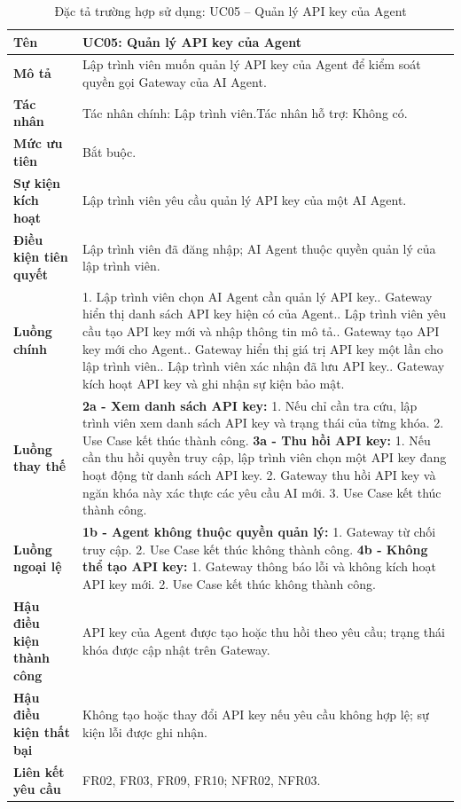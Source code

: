 \begin{longtable}{|L{4.2cm}|L{9.5cm}|}
\caption[Đặc tả UC05]{Đặc tả trường hợp sử dụng: UC05 -- Quản lý API key của Agent} \\\hline
\textbf{Tên} & UC05: Quản lý API key của Agent \\\hline
\textbf{Mô tả} & Lập trình viên muốn quản lý API key của Agent để kiểm soát quyền gọi Gateway của AI Agent.\\\hline
\textbf{Tác nhân} & Tác nhân chính: Lập trình viên.\newline Tác nhân hỗ trợ: Không có.\\\hline
\textbf{Mức ưu tiên} & Bắt buộc.\\\hline
\textbf{Sự kiện kích hoạt} & Lập trình viên yêu cầu quản lý API key của một AI Agent.\\\hline
\textbf{Điều kiện tiên quyết} & Lập trình viên đã đăng nhập; AI Agent thuộc quyền quản lý của lập trình viên.\\\hline
\textbf{Luồng chính} &
1. Lập trình viên chọn AI Agent cần quản lý API key.. Gateway hiển thị danh sách API key hiện có của Agent.. Lập trình viên yêu cầu tạo API key mới và nhập thông tin mô tả.. Gateway tạo API key mới cho Agent.. Gateway hiển thị giá trị API key một lần cho lập trình viên.. Lập trình viên xác nhận đã lưu API key.. Gateway kích hoạt API key và ghi nhận sự kiện bảo mật.\\\hline
\textbf{Luồng thay thế} &
\textbf{2a - Xem danh sách API key:} 1. Nếu chỉ cần tra cứu, lập trình viên xem danh sách API key và trạng thái của từng khóa. 2. Use Case kết thúc thành công.\newline
\textbf{3a - Thu hồi API key:} 1. Nếu cần thu hồi quyền truy cập, lập trình viên chọn một API key đang hoạt động từ danh sách API key. 2. Gateway thu hồi API key và ngăn khóa này xác thực các yêu cầu AI mới. 3. Use Case kết thúc thành công.\\\hline
\textbf{Luồng ngoại lệ} &
\textbf{1b - Agent không thuộc quyền quản lý:} 1. Gateway từ chối truy cập. 2. Use Case kết thúc không thành công.\newline
\textbf{4b - Không thể tạo API key:} 1. Gateway thông báo lỗi và không kích hoạt API key mới. 2. Use Case kết thúc không thành công.\\\hline
\textbf{Hậu điều kiện thành công} & API key của Agent được tạo hoặc thu hồi theo yêu cầu; trạng thái khóa được cập nhật trên Gateway.\\\hline
\textbf{Hậu điều kiện thất bại} & Không tạo hoặc thay đổi API key nếu yêu cầu không hợp lệ; sự kiện lỗi được ghi nhận.\\\hline
\textbf{Liên kết yêu cầu} & FR02, FR03, FR09, FR10; NFR02, NFR03.\\\hline
\end{longtable}


